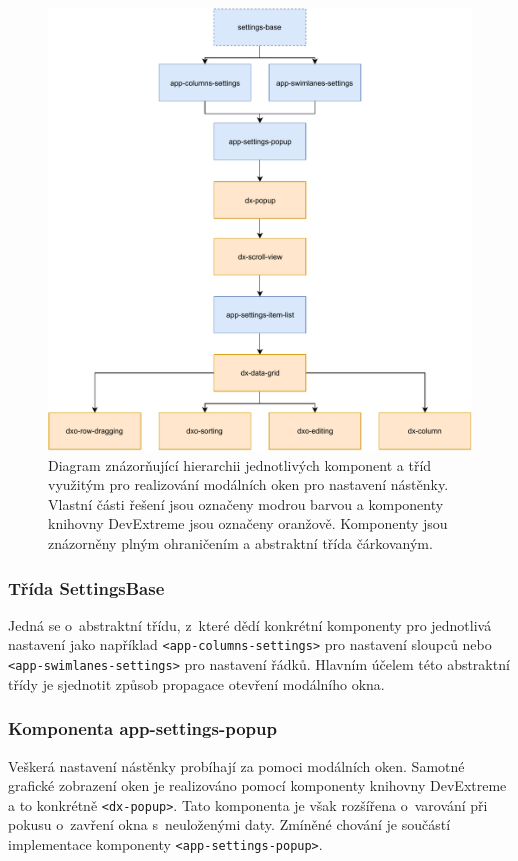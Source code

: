 \begin{figure}[H]
	\centering
	\label{img:settings-dia}
	\includegraphics[width=\textwidth]{obrazky-figures/settings-diagram.pdf}
	\caption{Diagram znázorňující hierarchii jednotlivých komponent a tříd využitým pro realizování modálních oken pro nastavení nástěnky. Vlastní části řešení jsou označeny modrou barvou a komponenty knihovny DevExtreme jsou označeny oranžově. Komponenty jsou znázorněny plným ohraničením a abstraktní třída čárkovaným.}
\end{figure}


\subsubsection*{Třída SettingsBase}
Jedná se o~abstraktní třídu, z~které dědí konkrétní komponenty pro jednotlivá nastavení jako například \texttt{<app-columns-settings>} pro nastavení sloupců nebo  \texttt{<app-swimlanes-settings>} pro nastavení řádků. Hlavním účelem této abstraktní třídy je sjednotit způsob propagace otevření modálního okna.


\subsubsection*{Komponenta app-settings-popup}
Veškerá nastavení nástěnky probíhají za pomoci modálních oken. Samotné grafické zobrazení oken je realizováno pomocí komponenty knihovny DevExtreme a to konkrétně \texttt{<dx-popup>}. Tato komponenta je však rozšířena o~varování při pokusu o~zavření okna s~neuloženými daty. Zmíněné chování je součástí implementace komponenty \texttt{<app-settings-popup>}.


